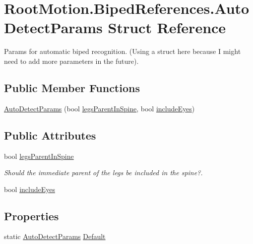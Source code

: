 \hypertarget{struct_root_motion_1_1_biped_references_1_1_auto_detect_params}{}\section{Root\+Motion.\+Biped\+References.\+Auto\+Detect\+Params Struct Reference}
\label{struct_root_motion_1_1_biped_references_1_1_auto_detect_params}


Params for automatic biped recognition. (Using a struct here because I might need to add more parameters in the future).  


\subsection*{Public Member Functions}
\begin{DoxyCompactItemize}
\item 
\mbox{\hyperlink{struct_root_motion_1_1_biped_references_1_1_auto_detect_params_a0c14be36ffcd310e315f86dbe334459d}{Auto\+Detect\+Params}} (bool \mbox{\hyperlink{struct_root_motion_1_1_biped_references_1_1_auto_detect_params_a24c34cc2fd0d29b7f2eddab01a9dd4b4}{legs\+Parent\+In\+Spine}}, bool \mbox{\hyperlink{struct_root_motion_1_1_biped_references_1_1_auto_detect_params_ab19f15a5289a463b80695597c35d474d}{include\+Eyes}})
\end{DoxyCompactItemize}
\subsection*{Public Attributes}
\begin{DoxyCompactItemize}
\item 
bool \mbox{\hyperlink{struct_root_motion_1_1_biped_references_1_1_auto_detect_params_a24c34cc2fd0d29b7f2eddab01a9dd4b4}{legs\+Parent\+In\+Spine}}
\begin{DoxyCompactList}\small\item\em Should the immediate parent of the legs be included in the spine?. \end{DoxyCompactList}\item 
bool \mbox{\hyperlink{struct_root_motion_1_1_biped_references_1_1_auto_detect_params_ab19f15a5289a463b80695597c35d474d}{include\+Eyes}}
\end{DoxyCompactItemize}
\subsection*{Properties}
\begin{DoxyCompactItemize}
\item 
static \mbox{\hyperlink{struct_root_motion_1_1_biped_references_1_1_auto_detect_params}{Auto\+Detect\+Params}} \mbox{\hyperlink{struct_root_motion_1_1_biped_references_1_1_auto_detect_params_a7116791f0f3a2ed9577035fb6690498b}{Default}}
\end{DoxyCompactItemize}


